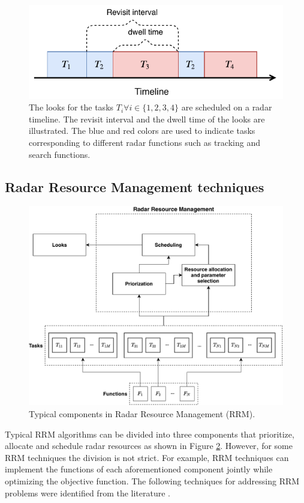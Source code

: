 \documentclass[english, 12pt, a4paper, elec, utf8, a-1b, online]{aaltothesis}
\begin{document}
\begin{figure}[h]
    \centering
    \includegraphics{figures/timeline.pdf}
    \caption{
        The looks for the tasks $T_i \forall i\in\{1,2,3,4\}$ are scheduled on a radar timeline. 
        The revisit interval and the dwell time of the looks are illustrated.
        The blue and red colors are used to indicate tasks corresponding to different radar functions such as tracking and search functions.
    }
    \label{fig:timeline}
\end{figure}

\subsection{Radar Resource Management techniques} \label{sec:RRM_tech}

\begin{figure}[tb]
    \centering
    \includegraphics[width=.9\linewidth]{figures/RRM_diagram.pdf}
    \caption{Typical components in Radar Resource Management (RRM).}
    \label{fig:RRM_diagram}
\end{figure}

Typical RRM algorithms can be divided into three components that prioritize, allocate and schedule radar resources as shown in Figure \ref{fig:RRM_diagram}.
However, for some RRM techniques the division is not strict.
For example, RRM techniques can implement the functions of each aforementioned component jointly while optimizing the objective function.
The following techniques for addressing RRM problems were identified from the literature \cite{Moo2016, Koch1999, Krishnamurthy1999, Krishnamurthy2001, Wintenby2006, LaScala2006, Rajkumar1997, Rajkumar1998, Kastella1997, Kreucher2004, Kreucher2005, Xu2010}.
\end{document}
